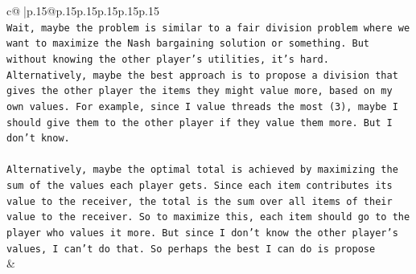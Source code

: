\documentclass{article}
\begin{document}
{\begin{supertabular}{c@{$\;$}|p{.15\linewidth}@{}p{.15\linewidth}p{.15\linewidth}p{.15\linewidth}p{.15\linewidth}p{.15\linewidth}}
{{{\\ 
\texttt{Wait, maybe the problem is similar to a fair division problem where we want to maximize the Nash bargaining solution or something. But without knowing the other player's utilities, it's hard. Alternatively, maybe the best approach is to propose a division that gives the other player the items they might value more, based on my own values. For example, since I value threads the most (3), maybe I should give them to the other player if they value them more. But I don't know.} \\
\\ 
\texttt{Alternatively, maybe the optimal total is achieved by maximizing the sum of the values each player gets. Since each item contributes its value to the receiver, the total is the sum over all items of their value to the receiver. So to maximize this, each item should go to the player who values it more. But since I don't know the other player's values, I can't do that. So perhaps the best I can do is propose} \\
            }
        }
    }
    & \\ \\


\end{supertabular}}
\end{document}
